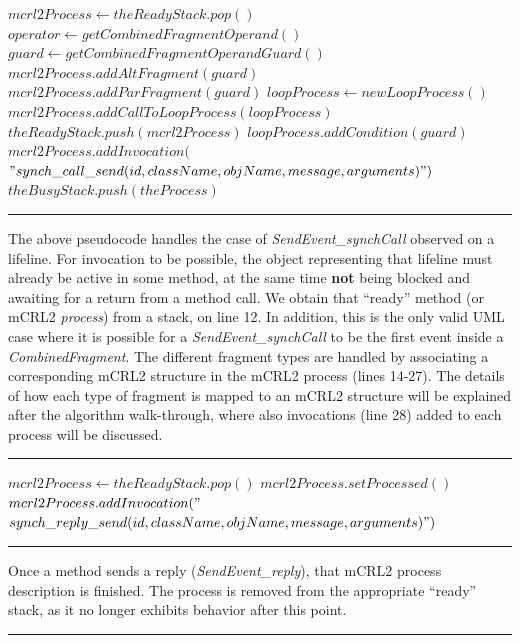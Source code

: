 \documentclass[letter]{llncs}
\begin{document}
\begin{algorithmic}[1]
     
      \State $mcrl2Process \gets theReadyStack.pop()$
	\State $operator \gets getCombinedFragmentOperand()$
	\State $guard \gets getCombinedFragmentOperandGuard()$
	  \State $mcrl2Process.addAltFragment(guard)$
	    \State 
	      [...]
	   \State $mcrl2Process.addParFragment(guard)$
	    \State $loopProcess \gets new LoopProcess()$
	    \State $mcrl2Process.addCallToLoopProcess(loopProcess)$
	    \State $theReadyStack.push(mcrl2Process)$
	    \State $loopProcess.addCondition(guard)$					
	\EndIf
	  \EndIf
	\State $mcrl2Process.addInvocation($
	      \State $"synch \_ call \_ send(id,className,objName,message,arguments)")$
	\State $theBusyStack.push(theProcess)$				
    \EndCase
\end{algorithmic}
\hrule 
\vspace{2 pt}
The above pseudocode handles the case of \emph{SendEvent\_synchCall} observed on a lifeline. For invocation to be possible,
the object representing that lifeline must already be active in some method, at the same time \textbf{not} being blocked and awaiting for a return from a method call. 
We obtain that ``ready'' method (or mCRL2 \emph{process}) from a stack, on line 12. 
In addition, this is the only valid UML case where it is possible
for a \emph{SendEvent\_synchCall} to be the first event inside a \emph{CombinedFragment}. The different fragment types 
are handled by associating a corresponding mCRL2 structure in the mCRL2 process (lines 14-27). The details of how each type of fragment is mapped
to an mCRL2 structure will be explained after the algorithm walk-through, where also invocations (line 28) added to each process will be discussed.
\vspace{2 pt}
\hrule
\begin{algorithmic}[1]
     
      \State $mcrl2Process \gets theReadyStack.pop()$
      \State $mcrl2Process.setProcessed()$
      \State $mcrl2Process.addInvocation("$
        \State $synch \_ reply \_ send(id,className,objName,message,arguments)")$
      \EndCase  
\end{algorithmic}
\hrule
\vspace{1 pt}
Once a method sends a reply (\emph{SendEvent\_reply}), that mCRL2 process description is finished. The process is removed from the appropriate ``ready'' stack, 
as it no longer exhibits behavior after this point.
\vspace{1 pt}
\hrule
\end{document}
